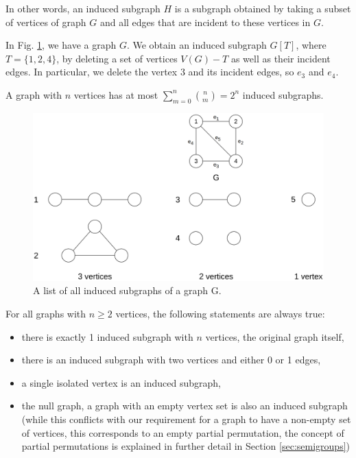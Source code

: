 In other words, an induced subgraph $H$ is a subgraph obtained by taking a subset of vertices of graph $G$ and all edges that are incident to these vertices in $G$.

In Fig. \ref{fig:induced_subgraphs}, we have a graph $G$. We obtain an induced subgraph $G[T]$, where $T = \{ 1, 2, 4 \}$, by deleting a set of vertices $V(G) - T$ as well as their incident edges. In particular, we delete the vertex $3$ and its incident edges, so $e_3$ and $e_4$.

A graph with $n$ vertices has at most $\displaystyle \sum_{m=0}^{n}{n \choose m} = 2^n$ induced subgraphs.

\begin{figure}[H]
\includegraphics[width=\textwidth,keepaspectratio]{images/induced_subgraphs_example.png}
\caption{A list of all induced subgraphs of a graph G.}
\label{fig:induced_subgraphs}
\end{figure}

For all graphs with $n \ge 2$ vertices, the following statements are always true:

\begin{itemize}
\item there is exactly 1 induced subgraph with $n$ vertices, the original graph itself,
\item there is an induced subgraph with two vertices and either 0 or 1 edges,
\item a single isolated vertex is an induced subgraph,
\item the null graph, a graph with an empty vertex set is also an induced subgraph (while this conflicts with our requirement for a graph to have a non-empty set of vertices, this corresponds to an empty partial permutation, the concept of partial permutations is explained in further detail in Section \ref{sec:semigroups})
\end{itemize}

